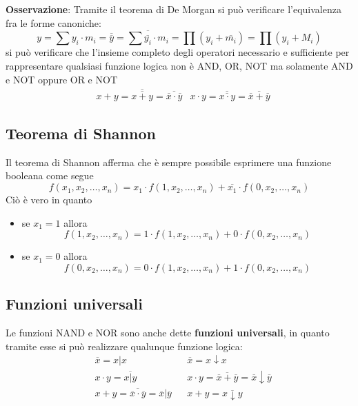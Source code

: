 \documentclass[a4paper]{extarticle}
\begin{document}
\vspace{1em}
\noindent
\textbf{Osservazione}: Tramite il teorema di De Morgan si può verificare l'equivalenza fra le forme canoniche:
\[y=\sum y_i \cdot m_i = \overline{\overline{y}} = \overline{\sum \overline{y_i} \cdot m_i} = \prod (y_i + \overline{m_i}) = \prod (y_i + M_i)\]
si può verificare che l'insieme completo degli operatori necessario e sufficiente per rappresentare qualsiasi funzione logica non è AND, OR, NOT ma solamente AND e NOT oppure OR e NOT
\begin{align*}
    &x+y=\overline{\overline{x+y}}=\overline{\overline{x} \cdot \overline{y}}
    &x \cdot y=\overline{\overline{x \cdot y}}=\overline{\overline{x} + \overline{y}}
\end{align*}

\vspace{1em}
\noindent
\subsection{Teorema di Shannon}
Il teorema di Shannon afferma che è sempre possibile esprimere una funzione booleana come segue
\[f(x_1,x_2,\dots,x_n)=x_1 \cdot f(1,x_2,\dots,x_n) + \overline{x_1} \cdot f(0,x_2,\dots,x_n)\]
Ciò è vero in quanto
\begin{itemize}
    \item se $x_1=1$ allora
    \[f(1,x_2,\dots,x_n)=1 \cdot f(1,x_2,\dots,x_n) + 0 \cdot f(0,x_2,\dots,x_n)\]
    \item se $x_1=0$ allora
    \[f(0,x_2,\dots,x_n)=0 \cdot f(1,x_2,\dots,x_n) + 1 \cdot f(0,x_2,\dots,x_n)\]
\end{itemize}

\vspace{1em}
\noindent
\subsection{Funzioni universali}
Le funzioni NAND e NOR sono anche dette \textbf{funzioni universali}, in quanto tramite esse si può realizzare qualunque funzione logica:
\begin{align*}
    &\overline{x}=x \vert x & & \overline{x} = x \downarrow x\\
    &x \cdot y = \overline{x \vert y} & & x \cdot y = \overline{\overline{x}+\overline{y}} = \overline{x} \downarrow \overline{y}\\
    &x+y=\overline{\overline{x} \cdot \overline{y}}=\overline{x} \vert \overline{y} & & x+y = \overline{x \downarrow y}
\end{align*}
\end{document}
